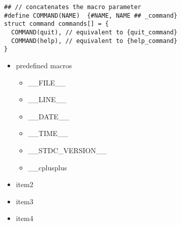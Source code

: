 \documentclass{article}
\begin{document}
      \begin{lstlisting}[style=cpp]
## // concatenates the macro parameter
#define COMMAND(NAME)  {#NAME, NAME ## _command}
struct command commands[] = {
  COMMAND(quit), // equivalent to {quit_command}
  COMMAND(help), // equivalent to {help_command}
}
\end{lstlisting}

      \begin{itemize}
        \item predefined macros
          \begin{itemize}
            \item \_\_FILE\_\_
            \item \_\_LINE\_\_
            \item \_\_DATE\_\_
            \item \_\_TIME\_\_
            \item \_\_STDC\_VERSION\_\_
            \item \_\_cplusplus
          \end{itemize}
        \item item2
        \item item3
        \item item4
      \end{itemize}
\end{document}
